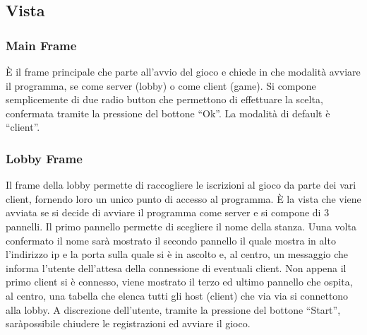 \subsection{Vista}



\subsubsection{Main Frame}
\label{subsubsection:progettazione_main_frame}
È il frame principale che parte all'avvio del gioco e chiede in che modalità
avviare il programma, se come server (lobby) o come client (game).\newline
Si compone semplicemente di due radio button che permettono di effettuare la
scelta, confermata tramite la pressione del bottone ``Ok''. La modalità di
default è ``client''.



\subsubsection{Lobby Frame}
\label{subsubsection:progettazione_lobby_frame}
Il frame della lobby permette di raccogliere le iscrizioni al gioco da parte dei
vari client, fornendo loro un unico punto di accesso al programma. È la vista
che viene avviata se si decide di avviare il programma come server e si compone
di 3 pannelli.\newline
Il primo pannello permette di scegliere il nome della stanza. Uuna volta
confermato il nome sarà mostrato il secondo pannello il quale mostra in alto
l'indirizzo ip e la porta sulla quale si è in ascolto e, al centro, un messaggio
che informa l'utente dell'attesa della connessione di eventuali client. Non
appena il primo client si è connesso, viene mostrato il terzo ed ultimo pannello
che ospita, al centro, una tabella che elenca tutti gli host (client) che via
via si connettono alla lobby. A discrezione dell'utente, tramite la pressione
del bottone ``Start'', saràpossibile chiudere le registrazioni ed avviare il
gioco.



